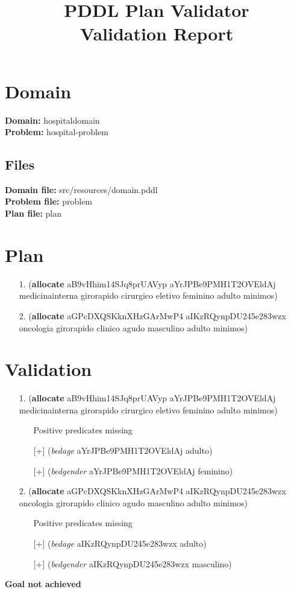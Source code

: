 \documentclass{article}
\title{\textbf{PDDL Plan Validator}\\Validation Report}
\date{} %
\begin{document}
\maketitle

\section{Domain}
\textbf{Domain:}  hospitaldomain\\
\textbf{Problem:} hospital-problem

\subsection{Files}
\textbf{Domain file:}  src/resources/domain.pddl \\
\textbf{Problem file:} problem\\
\textbf{Plan file:}    plan

\section{Plan}

\begin{itemize}
    \item[1.] (\textbf{allocate} aB9vHhim14SJq8prUAVyp aYrJPBe9PMH1T2OVEldAj medicinainterna girorapido cirurgico eletivo feminino adulto minimos)
    \item[2.] (\textbf{allocate} aGPcDXQSKknXHzGArMwP4 aIKzRQynpDU245e283wzx oncologia girorapido clinico agudo masculino adulto minimos)
\end{itemize}

\section{Validation}

\begin{itemize}
\item[1.] (\textbf{allocate} aB9vHhim14SJq8prUAVyp aYrJPBe9PMH1T2OVEldAj medicinainterna girorapido cirurgico eletivo feminino adulto minimos)
\begin{itemize}
	\item[\textbullet] Positive predicates missing
	\item[\textbullet] [+] (\textit{bedage} aYrJPBe9PMH1T2OVEldAj adulto)
	\item[\textbullet] [+] (\textit{bedgender} aYrJPBe9PMH1T2OVEldAj feminino)
\end{itemize}
\item[2.] (\textbf{allocate} aGPcDXQSKknXHzGArMwP4 aIKzRQynpDU245e283wzx oncologia girorapido clinico agudo masculino adulto minimos)
\begin{itemize}
	\item[\textbullet] Positive predicates missing
	\item[\textbullet] [+] (\textit{bedage} aIKzRQynpDU245e283wzx adulto)
	\item[\textbullet] [+] (\textit{bedgender} aIKzRQynpDU245e283wzx masculino)
\end{itemize}
\end{itemize}

\hline
\vspace{10pt}
\large \textbf{Goal not achieved}
\end{document}
